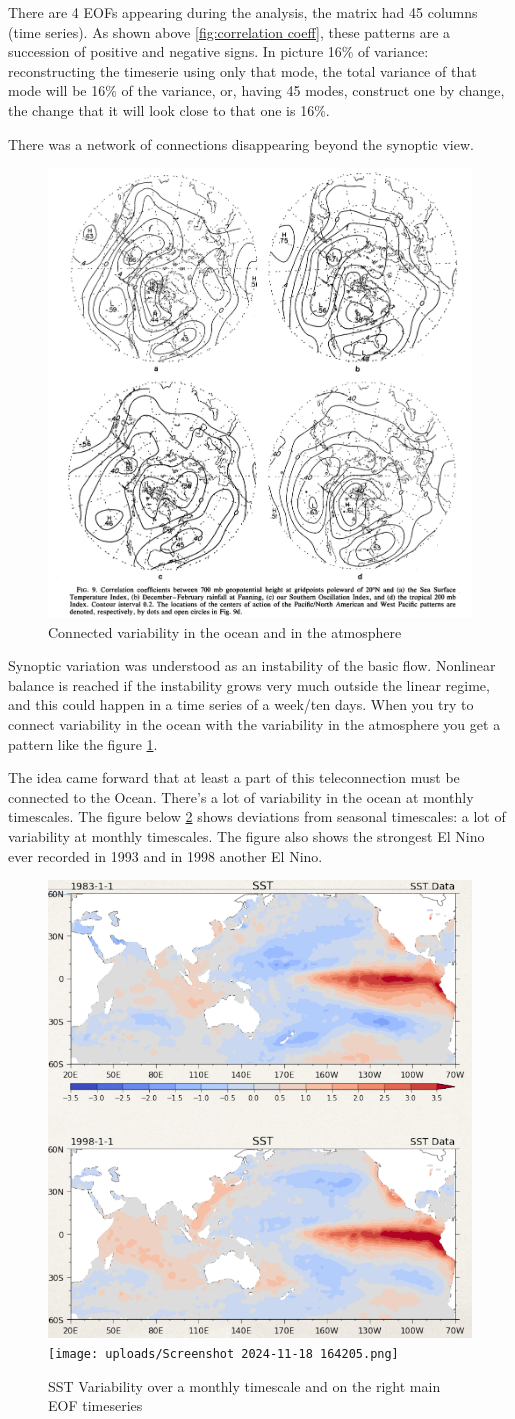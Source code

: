 There are 4 EOFs appearing during the analysis, the matrix had 45 columns (time series). As shown above \ref{fig:correlation coeff}, these patterns are a succession of positive and negative signs. In picture 16\% of variance: reconstructing the timeserie using only that mode, the total variance of that mode will be 16\% of the variance, or, having 45 modes, construct one by change, the change that it will look close to that one is 16\%.

There was a network of connections disappearing beyond the synoptic view.
\begin{figure}[htp!]
	\centering
	\includegraphics[width=0.4\linewidth]{upload/imageexploringvar.png}
	\caption{Connected variability in the ocean and in the atmosphere}
	\label{fig:conn var}
\end{figure}


Synoptic variation was understood as an instability of the basic flow. Nonlinear balance is reached if the instability grows very much outside the linear regime, and this could happen in a time series of a week/ten days.
When you try to connect variability in the ocean with the variability in the atmosphere you get a pattern like the figure \ref{fig:conn var}.






The idea came forward that at least a part of this teleconnection must be connected to the Ocean. There's a lot of variability in the ocean at monthly timescales. The figure below \ref{fig:SST VAR} shows deviations from seasonal timescales: a lot of variability at monthly timescales. The figure also shows the strongest El Nino ever recorded in 1993 and in 1998 another El Nino.
\begin{figure}[htpb]
	\centering
	\includegraphics[width=0.35\linewidth]{upload/Screenshot 2024-11-18 164612.png}\quad \texttt{[image: uploads/Screenshot 2024-11-18 164205.png]}
	\caption{SST Variability over a monthly timescale and on the right main EOF timeseries}
	\label{fig:SST VAR}
\end{figure}



